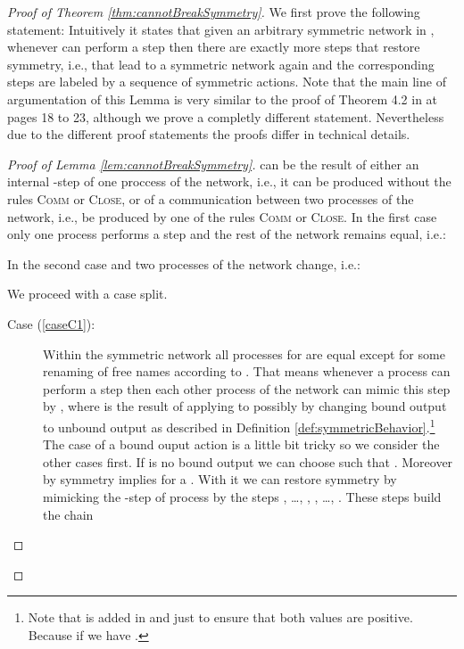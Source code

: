 \documentclass[11pt,techReport]{eptcs}
\begin{document}
\begin{proof}[Proof of Theorem \ref{thm:cannotBreakSymmetry}]
	We first prove the following statement:
	Intuitively it states that given an arbitrary symmetric network  in \procsep, whenever  can perform a step then there are exactly  more steps that restore symmetry, i.e., that lead to a symmetric network again and the corresponding  steps are labeled by a sequence of symmetric actions. Note that the main line of argumentation of this Lemma is very similar to the proof of Theorem 4.2 in \cite{palamidessi03} at pages 18 to 23, although we prove a completly different statement. Nevertheless due to the different proof statements the proofs differ in technical details.

\begin{proof}[Proof of Lemma \ref{lem:cannotBreakSymmetry}]
	 can be the result of either an internal -step of one proccess of the network, i.e., it can be produced without the rules \textsc{Comm} or \textsc{Close}, or of a communication between two processes of the network, i.e., be produced by one of the rules \textsc{Comm} or \textsc{Close}. In the first case only one process performs a step and the rest of the network remains equal, i.e.:
	
	In the second case  and two processes of the network change, i.e.:
	
	We proceed with a case split.
	\begin{description}
		\item[Case (\ref{caseC1}):] Within the symmetric network  all processes  for  are equal except for some renaming of free names according to . That means whenever a process  can perform a step  then each other process  of the network can mimic this step by , where  is the result of applying  to  possibly by changing bound output to unbound output as described in Definition \ref{def:symmetricBehavior}.\footnote{Note that  is added in  and  just to ensure that both values are positive. Because  if  we have .} The case of a bound ouput action  is a little bit tricky so we consider the other cases first. If  is no bound output we can choose  such that . Moreover by symmetry  implies  for a . With it we can restore symmetry by mimicking the -step of process  by the  steps , \ldots, , , \ldots, . These  steps build the chain
			

\end{description}
\end{proof}
\end{proof}
\end{document}

